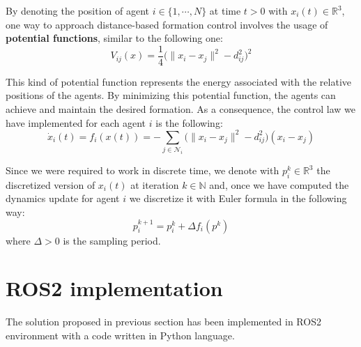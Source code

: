 \documentclass[a4paper,11pt,oneside]{book}
\begin{document}
By denoting the position of agent $i \in \{1, \cdots, N\}$ at time $t>0$ with $x_i(t) \in \mathbb{R}^3$, one way to approach distance-based formation control involves the usage of \textbf{potential functions}, similar to the following one:
\begin{equation}
V_{ij}(x)  = \frac{1}{4} \bigg( \lVert x_i - x_j \rVert^2 - d_{ij}^2 \bigg)^2
\label{Formation_potential}
\end{equation}

This kind of potential function represents the energy associated with the relative positions of the agents. By minimizing this potential function, the agents can achieve and maintain the desired formation.
As a consequence, the control law we have implemented for each agent $i$ is the following:
\begin{equation}
\dot{x}_i(t) = f_i(x(t)) = - \sum_{j \in \mathcal{N}_i} \bigg( \lVert x_i - x_j \rVert^2 - d_{ij}^2 \bigg) (x_i - x_j )
\label{Dynamics_no_collision_avoidance}
\end{equation}

Since we were required to work in discrete time, we denote with $p_i^k \in \mathbb{R}^3$ the discretized version of $x_i(t)$ at iteration $k \in \mathbb{N}$ and, once we have computed the dynamics update for agent $i$ we discretize it with Euler formula in the following way:
\begin{equation}
p_i^{k+1} = p_i^{k} + \Delta f_i(p^k)
\end{equation}
where $\Delta > 0$ is the sampling period.

\section{ROS2 implementation}
The solution proposed in previous section has been implemented in ROS2 environment with a code written in Python language.
\end{document}
